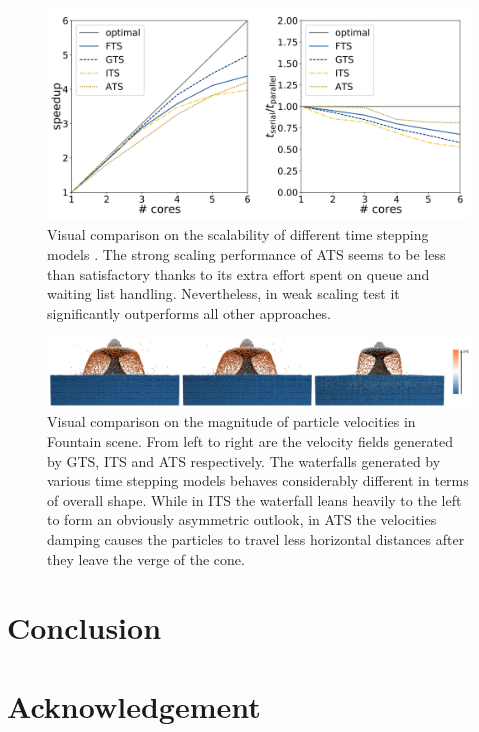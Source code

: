 \documentclass[
	11pt, 
	DIV10,
	ngerman,
	a4paper, 
	oneside, 
	headings=normal, 
	captions=tableheading,
	final, 
	numbers=noenddot
]{scrartcl}
\begin{document}
\begin{figure}[tb]
	\centering
	\includegraphics[scale=0.25]{images/8}
	\caption{\label{fig8} Visual comparison on the scalability of different time stepping models \cite{reinhardt2017fully}. The strong scaling performance of ATS seems to be less than satisfactory thanks to its extra effort spent on queue and waiting list handling. Nevertheless, in weak scaling test it significantly outperforms all other approaches.}
\end{figure}

\begin{figure}[tb]
	\centering
	\includegraphics[scale=0.18]{images/9}
	\caption{\label{fig9} Visual comparison on the magnitude of particle velocities in Fountain scene\cite{reinhardt2017fully}. From left to right are the velocity fields generated by GTS, ITS and ATS respectively. The waterfalls generated by various time stepping models behaves considerably different in terms of overall shape. While in ITS the waterfall leans heavily to the left to form an obviously asymmetric outlook, in ATS the velocities damping causes the particles to travel less horizontal distances after they leave the verge of the cone.}
\end{figure}

\section{Conclusion}
\section{Acknowledgement}



\end{document}
